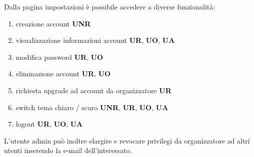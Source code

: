\documentclass{article}
\begin{document}
\begin{description}
\begin{center}
          \end{center}
    \item[] Dalla pagina impostazioni è possibile accedere a diverse funzionalità:
          \begin{enumerate}
              \item creazione account \textbf{UNR}
              \item visualizzazione informazioni account \textbf{UR}, \textbf{UO}, \textbf{UA}
              \item modifica password \textbf{UR}, \textbf{UO}
              \item eliminazione account \textbf{UR}, \textbf{UO}
              \item richiesta upgrade ad account da organizzatore \textbf{UR}
              \item switch tema chiaro / scuro \textbf{UNR}, \textbf{UR}, \textbf{UO}, \textbf{UA}
              \item logout \textbf{UR}, \textbf{UO}, \textbf{UA}
          \end{enumerate}
    \item[] L'utente admin può inoltre elargire e revocare privilegi da organizzatore ad altri utenti inserendo la e-mail dell'interessato.
\end{description}
\end{document}
